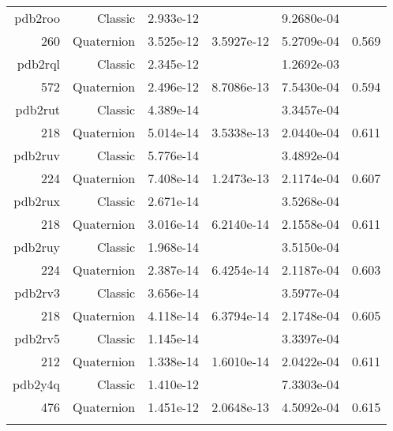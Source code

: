 \begin{xltabular}{\textwidth}{r|rS[table-format=1.3e+2]S[table-format=1.4e+2]S[table-format=1.4e+2]S[table-format=-1.3]}
pdb2roo & Classic & 2.933e-12 &  & 9.2680e-04 & \\
260 & Quaternion & 3.525e-12 & 3.5927e-12 & 5.2709e-04 & 0.569\\  \addlinespace
pdb2rql & Classic & 2.345e-12 &  & 1.2692e-03 & \\
572 & Quaternion & 2.496e-12 & 8.7086e-13 & 7.5430e-04 & 0.594\\  \addlinespace
pdb2rut & Classic & 4.389e-14 &  & 3.3457e-04 & \\
218 & Quaternion & 5.014e-14 & 3.5338e-13 & 2.0440e-04 & 0.611\\  \addlinespace
pdb2ruv & Classic & 5.776e-14 &  & 3.4892e-04 & \\
224 & Quaternion & 7.408e-14 & 1.2473e-13 & 2.1174e-04 & 0.607\\  \addlinespace
pdb2rux & Classic & 2.671e-14 &  & 3.5268e-04 & \\
218 & Quaternion & 3.016e-14 & 6.2140e-14 & 2.1558e-04 & 0.611\\  \addlinespace
pdb2ruy & Classic & 1.968e-14 &  & 3.5150e-04 & \\
224 & Quaternion & 2.387e-14 & 6.4254e-14 & 2.1187e-04 & 0.603\\  \addlinespace
pdb2rv3 & Classic & 3.656e-14 &  & 3.5977e-04 & \\
218 & Quaternion & 4.118e-14 & 6.3794e-14 & 2.1748e-04 & 0.605\\  \addlinespace
pdb2rv5 & Classic & 1.145e-14 &  & 3.3397e-04 & \\
212 & Quaternion & 1.338e-14 & 1.6010e-14 & 2.0422e-04 & 0.611\\  \addlinespace
pdb2y4q & Classic & 1.410e-12 &  & 7.3303e-04 & \\
476 & Quaternion & 1.451e-12 & 2.0648e-13 & 4.5092e-04 & 0.615\\  \addlinespace
\end{xltabular}
